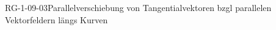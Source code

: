 
\begin{DEF}{RG-1-09-03}{Parallelverschiebung von Tangentialvektoren bzgl parallelen Vektorfeldern längs Kurven}
\end{DEF}
